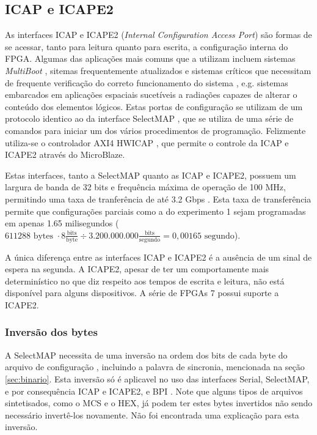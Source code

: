 \documentclass[11pt,a4paper,oneside]{book}
\begin{document}
\subsection{ICAP e ICAPE2}
As interfaces ICAP e ICAPE2 (\textit{Internal Configuration Access Port}) são formas de se acessar, tanto para leitura quanto para escrita, a configuração interna do FPGA.
Algumas das aplicações mais comuns que a utilizam incluem sistemas \textit{MultiBoot} \cite{xapp468, xapp1100}, sitemas frequentemente atualizados e sistemas críticos que necessitam de frequente verificação do correto funcionamento do sistema \cite{xapp468, xapp887}, e.g. sistemas embarcados em aplicações espaciais sucetíveis a radiações capazes de alterar o conteúdo dos elementos lógicos. 
Estas portas de configuração se utilizam de um protocolo identico ao da interface SelectMAP \cite{wp374, ug702}, que se utiliza de uma série de comandos para iniciar um dos vários procedimentos de programação.
Felizmente utiliza-se o controlador AXI4 HWICAP \cite{ds817}, que permite o controle da ICAP e ICAPE2 através do MicroBlaze.

Estas interfaces, tanto a SelectMAP quanto as ICAP e ICAPE2, possuem um largura de banda de 32 bits e frequência máxima de operação de 100 MHz, permitindo uma taxa de tranferência de até 3.2 Gbps \cite{ug702}.
Esta taxa de transferência permite que configurações parciais como a do experimento 1 sejam programadas em apenas 1.65 milisegundos ($611288\text{ bytes }\cdot8\frac{\text{bits}}{\text{byte}}\div3.200.000.000\frac{\text{bits}}{\text{segundo}} = 0,00165 \text{ segundo}$).

A única diferença entre as interfaces ICAP e ICAPE2 é a ausência de um sinal de espera na segunda.
A ICAPE2, apesar de ter um comportamente mais determinístico no que diz respeito aos tempos de escrita e leitura, não está disponível para alguns dispositivos.
A série de FPGAs 7 possui suporte a ICAPE2.

\subsubsection{Inversão dos bytes}
A SelectMAP necessita de uma inversão na ordem dos bits de cada byte do arquivo de configuração \cite{xapp502}, incluindo a palavra de sincronia, mencionada na seção \ref{sec:binario}.
Esta inversão só é aplicavel no uso das interfaces Serial, SelectMAP, e por consequência ICAP e ICAPE2, e BPI \cite{ug470}.
Note que alguns tipos de arquivos sintetisados, como o MCS e o HEX, já podem ter estes bytes invertidos não sendo necessário invertê-los novamente.
Não foi encontrada uma explicação para esta inversão.
\end{document}
